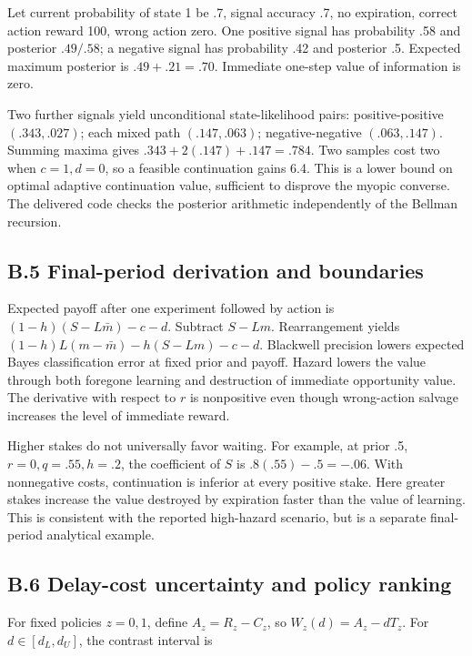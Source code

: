 \documentclass[
  11pt,
]{article}
\begin{document}
Let current probability of state 1 be .7, signal accuracy .7, no
expiration, correct action reward 100, wrong action zero. One positive
signal has probability .58 and posterior \(.49/.58\); a negative signal
has probability .42 and posterior .5. Expected maximum posterior is
\(.49+.21=.70\). Immediate one-step value of information is zero.

Two further signals yield unconditional state-likelihood pairs:
positive-positive \((.343,.027)\); each mixed path \((.147,.063)\);
negative-negative \((.063,.147)\). Summing maxima gives
\(.343+2(.147)+.147=.784\). Two samples cost two when \(c=1,d=0\), so a
feasible continuation gains 6.4. This is a lower bound on optimal
adaptive continuation value, sufficient to disprove the myopic converse.
The delivered code checks the posterior arithmetic independently of the
Bellman recursion.

\subsection{B.5 Final-period derivation and
boundaries}\label{b.5-final-period-derivation-and-boundaries}

Expected payoff after one experiment followed by action is
\((1-h)(S-L\bar m)-c-d\). Subtract \(S-Lm\). Rearrangement yields
\((1-h)L(m-\bar m)-h(S-Lm)-c-d\). Blackwell precision lowers expected
Bayes classification error at fixed prior and payoff. Hazard lowers the
value through both foregone learning and destruction of immediate
opportunity value. The derivative with respect to \(r\) is nonpositive
even though wrong-action salvage increases the level of immediate
reward.

Higher stakes do not universally favor waiting. For example, at prior
.5, \(r=0,q=.55,h=.2\), the coefficient of \(S\) is \(.8(.55)-.5=-.06\).
With nonnegative costs, continuation is inferior at every positive
stake. Here greater stakes increase the value destroyed by expiration
faster than the value of learning. This is consistent with the reported
high-hazard scenario, but is a separate final-period analytical example.

\subsection{B.6 Delay-cost uncertainty and policy
ranking}\label{b.6-delay-cost-uncertainty-and-policy-ranking}

For fixed policies \(z=0,1\), define \(A_z=R_z-C_z\), so
\(W_z(d)=A_z-dT_z\). For \(d\in[d_L,d_U]\), the contrast interval is
\end{document}
